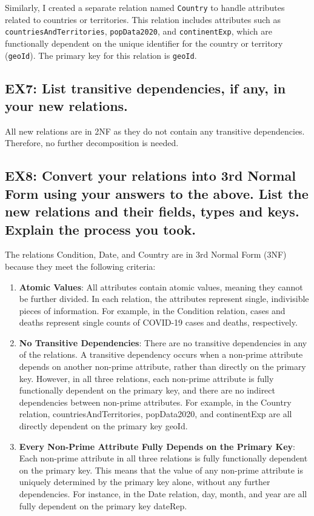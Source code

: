 \documentclass{article}
\begin{document}
Similarly, I created a separate relation named \texttt{Country} to handle attributes related to countries or territories. This relation includes attributes such as \texttt{countriesAndTerritories}, \texttt{popData2020}, and \texttt{continentExp}, which are functionally dependent on the unique identifier for the country or territory (\texttt{geoId}). The primary key for this relation is \texttt{geoId}.

\subsection*{EX7: List transitive dependencies, if any, in your new relations.}
All new relations are in 2NF as they do not contain any transitive dependencies. Therefore, no further decomposition is needed.

\subsection*{EX8: Convert your relations into 3rd Normal Form using your answers to the above. List the new relations and their fields, types and keys. Explain the process you took.}

The relations Condition, Date, and Country are in 3rd Normal Form (3NF) because they meet the following criteria:

\begin{enumerate}
    \item \textbf{Atomic Values}: All attributes contain atomic values, meaning they cannot be further divided. In each relation, the attributes represent single, indivisible pieces of information. For example, in the Condition relation, cases and deaths represent single counts of COVID-19 cases and deaths, respectively.
    
    \item \textbf{No Transitive Dependencies}: There are no transitive dependencies in any of the relations. A transitive dependency occurs when a non-prime attribute depends on another non-prime attribute, rather than directly on the primary key. However, in all three relations, each non-prime attribute is fully functionally dependent on the primary key, and there are no indirect dependencies between non-prime attributes. For example, in the Country relation, countriesAndTerritories, popData2020, and continentExp are all directly dependent on the primary key geoId.
    
    \item \textbf{Every Non-Prime Attribute Fully Depends on the Primary Key}: Each non-prime attribute in all three relations is fully functionally dependent on the primary key. This means that the value of any non-prime attribute is uniquely determined by the primary key alone, without any further dependencies. For instance, in the Date relation, day, month, and year are all fully dependent on the primary key dateRep.
\end{enumerate}
\end{document}
